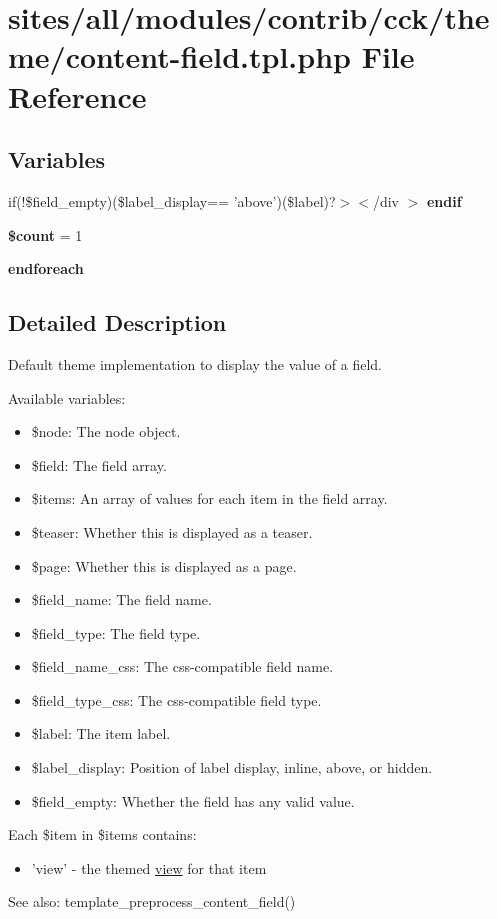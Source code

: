 \hypertarget{content-field_8tpl_8php}{
\section{sites/all/modules/contrib/cck/theme/content-field.tpl.php File Reference}
\label{content-field_8tpl_8php}
}
\subsection*{Variables}
\begin{CompactItemize}
\item 
\hypertarget{content-field_8tpl_8php_82cd33ca97ff99f2fcc5e9c81d65251b}{
if(!\$field\_\-empty)(\$label\_\-display== 'above')(\$label)?$>$$<$/div $>$ \textbf{endif}}
\label{content-field_8tpl_8php_82cd33ca97ff99f2fcc5e9c81d65251b}

\item 
\hypertarget{content-field_8tpl_8php_6f198e1c06d1f9d42d45dd91d1323d41}{
\textbf{\$count} = 1}
\label{content-field_8tpl_8php_6f198e1c06d1f9d42d45dd91d1323d41}

\item 
\hypertarget{content-field_8tpl_8php_672d9707ef91db026c210f98cc601123}{
\textbf{endforeach}}
\label{content-field_8tpl_8php_672d9707ef91db026c210f98cc601123}

\end{CompactItemize}


\subsection{Detailed Description}
Default theme implementation to display the value of a field.

Available variables:\begin{itemize}
\item \$node: The node object.\item \$field: The field array.\item \$items: An array of values for each item in the field array.\item \$teaser: Whether this is displayed as a teaser.\item \$page: Whether this is displayed as a page.\item \$field\_\-name: The field name.\item \$field\_\-type: The field type.\item \$field\_\-name\_\-css: The css-compatible field name.\item \$field\_\-type\_\-css: The css-compatible field type.\item \$label: The item label.\item \$label\_\-display: Position of label display, inline, above, or hidden.\item \$field\_\-empty: Whether the field has any valid value.\end{itemize}


Each \$item in \$items contains:\begin{itemize}
\item 'view' - the themed \hyperlink{classview}{view} for that item\end{itemize}


\begin{Desc}
\item[See also:]template\_\-preprocess\_\-content\_\-field() \end{Desc}
